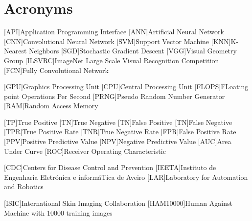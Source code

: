 \chapter{Acronyms}

\footnotesize
\SingleSpacing

\begin{multicols}{2}
\begin{acronym}[AAAAAA]

	[API]{Application Programming Interface}
	[ANN]{Artificial Neural Network}
	[CNN]{Convolutional Neural Network}
    [SVM]{Support Vector Machine}
    [KNN]{K-Nearest Neighbors}
	[SGD]{Stochastic Gradient Descent}
	[VGG]{Visual Geometry Group}
    [ILSVRC]{ImageNet Large Scale Visual Recognition Competition}
    [FCN]{Fully Convolutional Network}

    [GPU]{Graphics Processing Unit}
	[CPU]{Central Processing Unit}
    [FLOPS]{FLoating point Operations Per Second}
	[PRNG]{Pseudo Random Number Generator}
	[RAM]{Random Access Memory}

    [TP]{True Positive}
    [TN]{True Negative}
    [TN]{False Positive}
    [TN]{False Negative}
    [TPR]{True Positive Rate}
    [TNR]{True Negative Rate}
    [FPR]{False Positive Rate}
    [PPV]{Positive Predictive Value}
    [NPV]{Negative Predictive Value}
    [AUC]{Area Under Curve}
    [ROC]{Receiver Operating Characteristic}

    [CDC]{Centers for Disease Control and Prevention}
    [IEETA]{Instituto de Engenharia Eletrónica e informáTica de Aveiro}
    [LAR]{Laboratory for Automation and Robotics}

    [ISIC]{International Skin Imaging Collaboration}
    [HAM10000]{Human Against Machine with 10000 training images}

\end{acronym}
\end{multicols}
